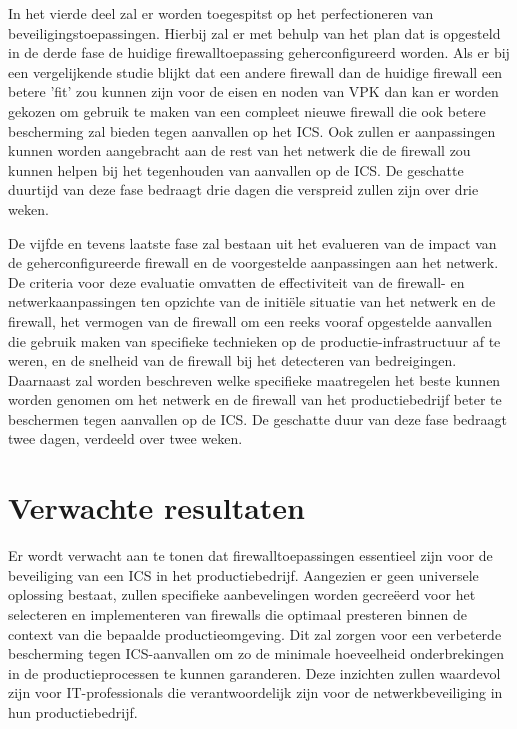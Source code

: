 In het vierde deel zal er worden toegespitst op het perfectioneren van beveiligingstoepassingen. Hierbij zal er met behulp van het plan dat is opgesteld in de derde fase de huidige firewalltoepassing geherconfigureerd worden. Als er bij een vergelijkende studie blijkt dat een andere firewall dan de huidige firewall een betere 'fit' zou kunnen zijn voor de eisen en noden van VPK dan kan er worden gekozen om gebruik te maken van een compleet nieuwe firewall die ook betere bescherming zal bieden tegen aanvallen op het ICS. Ook zullen er aanpassingen kunnen worden aangebracht aan de rest van het netwerk die de firewall zou kunnen helpen bij het tegenhouden van aanvallen op de ICS. De geschatte duurtijd van deze fase bedraagt drie dagen die verspreid zullen zijn over drie weken.

De vijfde en tevens laatste fase zal bestaan uit het evalueren van de impact van de geherconfigureerde firewall en de voorgestelde aanpassingen aan het netwerk. De criteria voor deze evaluatie omvatten de effectiviteit van de firewall- en netwerkaanpassingen ten opzichte van de initiële situatie van het netwerk en de firewall, het vermogen van de firewall om een reeks vooraf opgestelde aanvallen die gebruik maken van specifieke technieken op de productie-infrastructuur af te weren, en de snelheid van de firewall bij het detecteren van bedreigingen. Daarnaast zal worden beschreven welke specifieke maatregelen het beste kunnen worden genomen om het netwerk en de firewall van het productiebedrijf beter te beschermen tegen aanvallen op de ICS. De geschatte duur van deze fase bedraagt twee dagen, verdeeld over twee weken. 

\section{Verwachte resultaten}%
\label{sec:verwachte-resultaten}

Er wordt verwacht aan te tonen dat firewalltoepassingen essentieel zijn voor de beveiliging van een ICS in het productiebedrijf. Aangezien er geen universele oplossing bestaat, zullen specifieke aanbevelingen worden gecreëerd voor het selecteren en implementeren van firewalls die optimaal presteren binnen de context van die bepaalde productieomgeving. Dit zal zorgen voor een verbeterde bescherming tegen ICS-aanvallen om zo de minimale hoeveelheid onderbrekingen in de productieprocessen te kunnen garanderen. Deze inzichten zullen waardevol zijn voor IT-professionals die verantwoordelijk zijn voor de netwerkbeveiliging in hun productiebedrijf.

